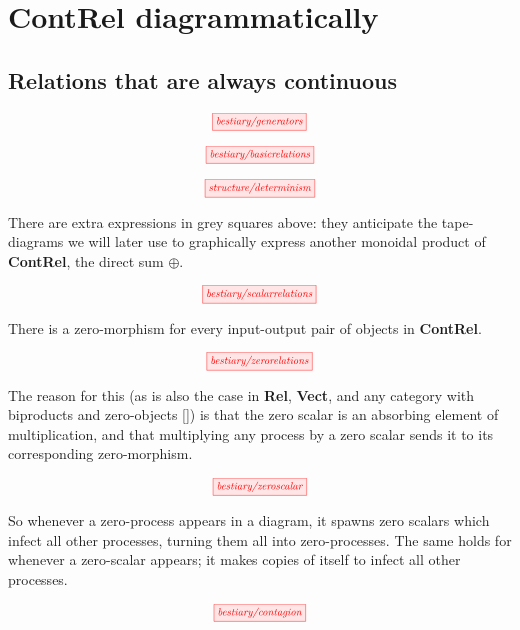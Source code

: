 \section{\textbf{ContRel} diagrammatically}

\subsection{Relations that are always continuous}


\[\scalebox{0.75}{\tikzfig{bestiary/generators}}\]


\[\scalebox{0.75}{\tikzfig{bestiary/basicrelations}}\]


\[\scalebox{0.75}{\tikzfig{structure/determinism}}\]

 There are extra expressions in grey squares above: they anticipate the tape-diagrams we will later use to graphically express another monoidal product of \textbf{ContRel}, the direct sum $\oplus$.

\[\scalebox{0.75}{\tikzfig{bestiary/scalarrelations}}\]

 There is a zero-morphism for every input-output pair of objects in \textbf{ContRel}. 

\[\scalebox{0.75}{\tikzfig{bestiary/zerorelations}}\]

The reason for this (as is also the case in \textbf{Rel}, \textbf{Vect}, and any category with biproducts and zero-objects []) is that the zero scalar is an absorbing element of multiplication, and that multiplying any process by a zero scalar sends it to its corresponding zero-morphism.

\[\scalebox{0.75}{\tikzfig{bestiary/zeroscalar}}\]

So whenever a zero-process appears in a diagram, it spawns zero scalars which infect all other processes, turning them all into zero-processes. The same holds for whenever a zero-scalar appears; it makes copies of itself to infect all other processes.

\[\scalebox{0.75}{\tikzfig{bestiary/contagion}}\]